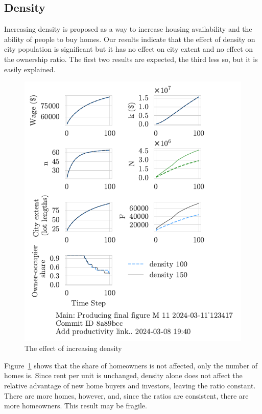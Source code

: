 

\newpage


\subsection{Density}
Increasing density is proposed as a way to increase housing availability and the ability of people to buy homes. Our results indicate that the effect of density on city population is significant but it has no effect on city extent and no effect on the ownership ratio. The first two results are expected, the third less so, but it is easily explained. 


\begin{figure}[h!bt]
    \centering
    \includegraphics[scale=1, trim={0 1.4cm 0 0},clip]{fig/density-Main-123417.pdf}
    \caption{The effect of increasing density}
    \label{fig:density_ownership_trajectory}
\end{figure}

Figure~\ref{fig:density_ownership_trajectory} shows that the share of homeowners is not affected, only the number of homes is. Since rent per unit is unchanged, density alone does not affect the relative advantage of new home buyers and investors, leaving the ratio constant. There are more homes, however, and, since the ratios are consistent, there are more homeowners. This result may be fragile.

